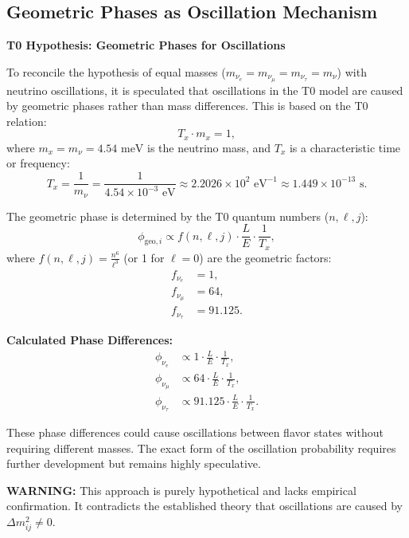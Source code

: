 \documentclass[12pt,a4paper]{article}
\begin{document}
	\subsection{Geometric Phases as Oscillation Mechanism}
	
	\begin{speculation}
		\textbf{T0 Hypothesis: Geometric Phases for Oscillations}
		
		To reconcile the hypothesis of equal masses (\(m_{\nu_e} = m_{\nu_\mu} = m_{\nu_\tau} = m_\nu\)) with neutrino oscillations, it is speculated that oscillations in the T0 model are caused by geometric phases rather than mass differences. This is based on the T0 relation:
		\[
		T_x \cdot m_x = 1,
		\]
		where \(m_x = m_\nu = 4.54 \text{ meV}\) is the neutrino mass, and \(T_x\) is a characteristic time or frequency:
		\[
		T_x = \frac{1}{m_\nu} = \frac{1}{4.54 \times 10^{-3} \text{ eV}} \approx 2.2026 \times 10^2 \text{ eV}^{-1} \approx 1.449 \times 10^{-13} \text{ s}.
		\]
		
		The geometric phase is determined by the T0 quantum numbers (\(n, \ell, j\)):
		\[
		\phi_{\text{geo}, i} \propto f(n, \ell, j) \cdot \frac{L}{E} \cdot \frac{1}{T_x},
		\]
		where \(f(n, \ell, j) = \frac{n^6}{\ell^3}\) (or 1 for \(\ell = 0\)) are the geometric factors:
		\begin{align}
			f_{\nu_e} &= 1, \\
			f_{\nu_\mu} &= 64, \\
			f_{\nu_\tau} &= 91.125.
		\end{align}
		
		\textbf{Calculated Phase Differences:}
		\begin{align}
			\phi_{\nu_e} &\propto 1 \cdot \frac{L}{E} \cdot \frac{1}{T_x}, \\
			\phi_{\nu_\mu} &\propto 64 \cdot \frac{L}{E} \cdot \frac{1}{T_x}, \\
			\phi_{\nu_\tau} &\propto 91.125 \cdot \frac{L}{E} \cdot \frac{1}{T_x}.
		\end{align}
		
		These phase differences could cause oscillations between flavor states without requiring different masses. The exact form of the oscillation probability requires further development but remains highly speculative.
		
		\textbf{WARNING:} This approach is purely hypothetical and lacks empirical confirmation. It contradicts the established theory that oscillations are caused by \(\Delta m^2_{ij} \neq 0\).
	\end{speculation}
	
\end{document}
